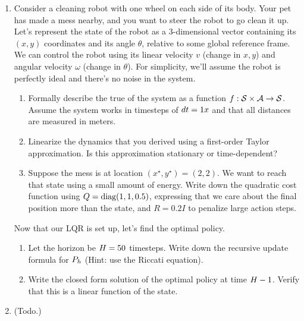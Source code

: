 \documentclass[../main/main]{subfiles}
\begin{document}
\begin{enumerate}
\item Consider a cleaning robot with one wheel on each side of its body. Your pet has made a mess nearby, and you want to steer the robot to go clean it up.
Let's represent the state of the robot as a $3$-dimensional vector containing its $(x, y)$ coordinates and its angle $\theta$, relative to some global reference frame.
We can control the robot using its linear velocity $v$ (change in $x, y$) and angular velocity $\omega$ (change in $\theta$).
For simplicity, we'll assume the robot is perfectly ideal and there's no noise in the system.
\begin{enumerate}
    \item Formally describe the true of the system as a function $f : \mathcal{S} \times \mathcal{A} \to \mathcal{S}$. Assume the system works in timesteps of $dt = 1 x$ and that all distances are measured in meters.
    \item Linearize the dynamics that you derived using a first-order Taylor approximation. Is this approximation stationary or time-dependent?
    \item Suppose the mess is at location $(x^\star, y^\star) = (2, 2)$. We want to reach that state using a small amount of energy. Write down the quadratic cost function using $Q = \operatorname*{\textrm{diag}}(1, 1, 0.5)$, expressing that we care about the final position more than the state, and $R = 0.2 I$ to penalize large action steps.
\end{enumerate}
Now that our LQR is set up, let's find the optimal policy.
\begin{enumerate}
    \item Let the horizon be $H = 50$ timesteps. Write down the recursive update formula for $P_h$ (Hint: use the Riccati equation).
    \item Write the closed form solution of the optimal policy at time $H-1$. Verify that this is a linear function of the state. 
\end{enumerate}

\item (Todo.)


\end{enumerate}
\end{document}

